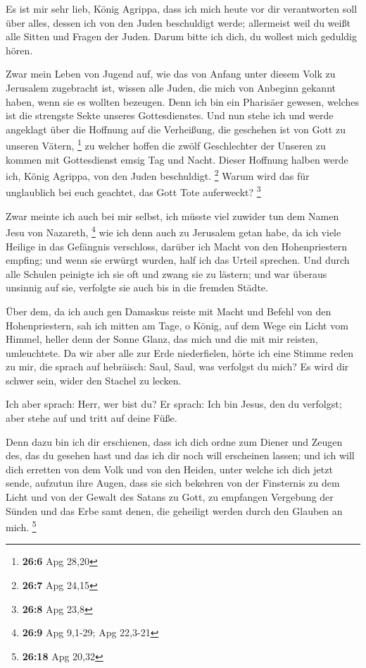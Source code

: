  Es ist mir sehr lieb, König Agrippa, dass ich mich heute
vor dir verantworten soll über alles, dessen ich von den Juden
beschuldigt werde;  allermeist weil du weißt alle Sitten und
Fragen der Juden. Darum bitte ich dich, du wollest mich geduldig hören.

 Zwar mein Leben von Jugend auf, wie das von Anfang unter
diesem Volk zu Jerusalem zugebracht ist, wissen alle Juden, 
die mich von Anbeginn gekannt haben, wenn sie es wollten bezeugen. Denn
ich bin ein Pharisäer gewesen, welches ist die strengste Sekte unseres
Gottesdienstes.  Und nun stehe ich und werde angeklagt über
die Hoffnung auf die Verheißung, die geschehen ist von Gott zu unseren
Vätern, \footnote{\textbf{26:6} Apg 28,20}  zu welcher
hoffen die zwölf Geschlechter der Unseren zu kommen mit Gottesdienst
emsig Tag und Nacht. Dieser Hoffnung halben werde ich, König Agrippa,
von den Juden beschuldigt. \footnote{\textbf{26:7} Apg 24,15}
 Warum wird das für unglaublich bei euch geachtet, das Gott
Tote auferweckt? \footnote{\textbf{26:8} Apg 23,8}

 Zwar meinte ich auch bei mir selbst, ich müsste viel
zuwider tun dem Namen Jesu von Nazareth, \footnote{\textbf{26:9} Apg
  9,1-29; Apg 22,3-21}  wie ich denn auch zu Jerusalem
getan habe, da ich viele Heilige in das Gefängnis verschloss, darüber
ich Macht von den Hohenpriestern empfing; und wenn sie erwürgt wurden,
half ich das Urteil sprechen.  Und durch alle Schulen
peinigte ich sie oft und zwang sie zu lästern; und war überaus unsinnig
auf sie, verfolgte sie auch bis in die fremden Städte.

 Über dem, da ich auch gen Damaskus reiste mit Macht und
Befehl von den Hohenpriestern,  sah ich mitten am Tage, o
König, auf dem Wege ein Licht vom Himmel, heller denn der Sonne Glanz,
das mich und die mit mir reisten, umleuchtete.  Da wir aber
alle zur Erde niederfielen, hörte ich eine Stimme reden zu mir, die
sprach auf hebräisch: Saul, Saul, was verfolgst du mich? Es wird dir
schwer sein, wider den Stachel zu lecken.

 Ich aber sprach: Herr, wer bist du? Er sprach: Ich bin
Jesus, den du verfolgst; aber stehe auf und tritt auf deine Füße.

 Denn dazu bin ich dir erschienen, dass ich dich ordne zum
Diener und Zeugen des, das du gesehen hast und das ich dir noch will
erscheinen lassen;  und ich will dich erretten von dem Volk
und von den Heiden, unter welche ich dich jetzt sende, 
aufzutun ihre Augen, dass sie sich bekehren von der Finsternis zu dem
Licht und von der Gewalt des Satans zu Gott, zu empfangen Vergebung der
Sünden und das Erbe samt denen, die geheiligt werden durch den Glauben
an mich. \footnote{\textbf{26:18} Apg 20,32}

